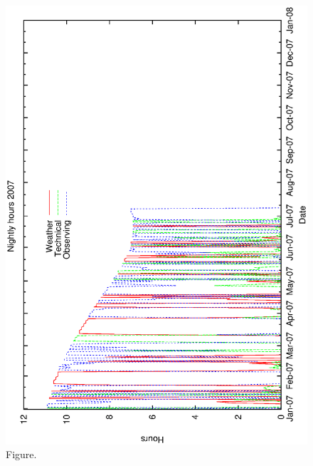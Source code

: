 \documentclass[12pt,a4paper]{article}
\begin{document}
\begin{figure}[htbp]
 \begin{center}
  \includegraphics[scale=1.0, angle=0]{figures/met_nightly_stats_g2007.eps}
 \end{center}
  \caption[Figure.]
{Figure.}
\end{figure}
\clearpage
\end{document}
